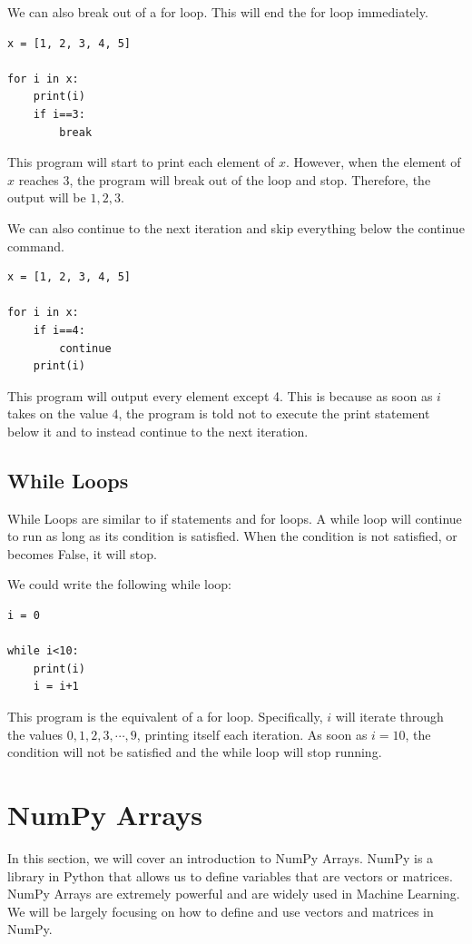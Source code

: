 \documentclass{article}
\begin{document}
We can also break out of a for loop. This will end the for loop immediately. 
\begin{lstlisting}
x = [1, 2, 3, 4, 5]

for i in x:
    print(i)
    if i==3:
        break
\end{lstlisting}
This program will start to print each element of $x$. However, when the element of $x$ reaches 3, the program will break out of the loop and stop. Therefore, the output will be $1,2,3$. 

We can also continue to the next iteration and skip everything below the continue command. 
\begin{lstlisting}
x = [1, 2, 3, 4, 5]

for i in x: 
    if i==4:
        continue
    print(i)
\end{lstlisting}
This program will output every element except 4. This is because as soon as $i$ takes on the value $4$, the program is told not to execute the print statement below it and to instead continue to the next iteration. 

\subsection{While Loops}
While Loops are similar to if statements and for loops. A while loop will continue to run as long as its condition is satisfied. When the condition is not satisfied, or becomes False, it will stop.

We could write the following while loop:
\begin{lstlisting}
i = 0

while i<10:
    print(i)
    i = i+1
\end{lstlisting}
This program is the equivalent of a for loop. Specifically, $i$ will iterate through the values $0,1,2,3,\cdots,9$, printing itself each iteration. As soon as $i=10$, the condition will not be satisfied and the while loop will stop running. 
\section{NumPy Arrays}
In this section, we will cover an introduction to NumPy Arrays. NumPy is a library in Python that allows us to define variables that are vectors or matrices. NumPy Arrays are extremely powerful and are widely used in Machine Learning. We will be largely focusing on how to define and use vectors and matrices in NumPy. 
\end{document}
